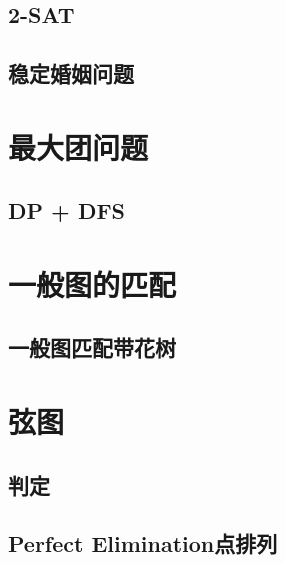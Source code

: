 \subsection{2-SAT}


\subsection{稳定婚姻问题}





\section{最大团问题}
\subsection{DP + DFS}



\section{一般图的匹配}
\subsection{一般图匹配带花树}


\section{弦图}
\subsection{判定}


\subsection{Perfect Elimination点排列}




\endinput %
